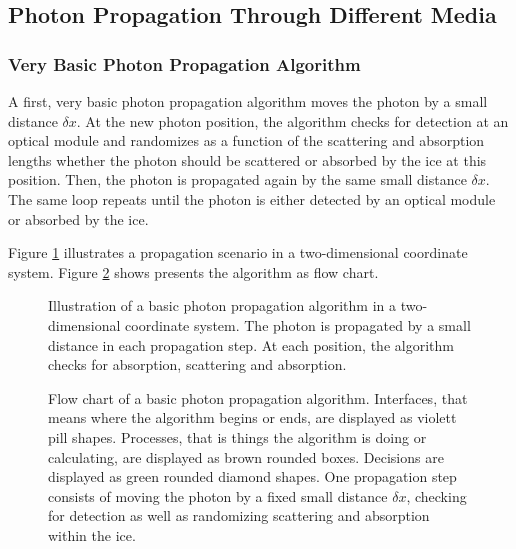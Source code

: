 
\subsection{Photon Propagation Through Different Media}

\subsubsection{Very Basic Photon Propagation Algorithm}


A first, very basic photon propagation algorithm moves the photon by a small distance $\delta x$. At the new photon position, the algorithm checks for detection at an optical module and randomizes as a function of the scattering and absorption lengths whether the photon should be scattered or absorbed by the ice at this position. Then, the photon is propagated again by the same small distance $\delta x$. The same loop repeats until the photon is either detected by an optical module or absorbed by the ice.

Figure \ref{fig:ieph6Bie} illustrates a propagation scenario in a two-dimensional coordinate system. Figure \ref{fig:ohsa0miG} shows presents the algorithm as flow chart.

\begin{figure}[htb]
  \label{fig:ieph6Bie}
  \caption{Illustration of a basic photon propagation algorithm in a two-dimensional coordinate system. The photon is propagated by a small distance in each propagation step. At each position, the algorithm checks for absorption, scattering and absorption.}
\end{figure}

\begin{figure}[htb]
  \label{fig:ohsa0miG}
  \caption{Flow chart of a basic photon propagation algorithm. Interfaces, that means where the algorithm begins or ends, are displayed as violett pill shapes. Processes, that is things the algorithm is doing or calculating, are displayed as brown rounded boxes. Decisions are displayed as green rounded diamond shapes. One propagation step consists of moving the photon by a fixed small distance $\delta x$, checking for detection as well as randomizing scattering and absorption within the ice.}
\end{figure}

